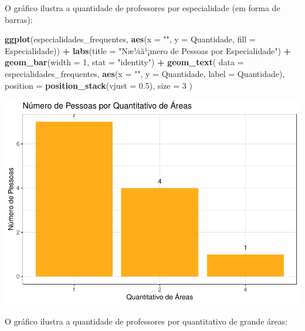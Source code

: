 \documentclass[]{article}
\newenvironment{Shaded}{\begin{snugshade}}{\end{snugshade}}
\newcommand{\DataTypeTok}[1]{\textcolor[rgb]{0.13,0.29,0.53}{#1}}
\newcommand{\DecValTok}[1]{\textcolor[rgb]{0.00,0.00,0.81}{#1}}
\newcommand{\FloatTok}[1]{\textcolor[rgb]{0.00,0.00,0.81}{#1}}
\newcommand{\KeywordTok}[1]{\textcolor[rgb]{0.13,0.29,0.53}{\textbf{#1}}}
\newcommand{\NormalTok}[1]{#1}
\newcommand{\OperatorTok}[1]{\textcolor[rgb]{0.81,0.36,0.00}{\textbf{#1}}}
\newcommand{\StringTok}[1]{\textcolor[rgb]{0.31,0.60,0.02}{#1}}
\begin{document}
O gráfico ilustra a quantidade de professores por especialidade (em
forma de barras):

\begin{Shaded}
\begin{Highlighting}[]
\KeywordTok{ggplot}\NormalTok{(especialidades_frequentes,}
       \KeywordTok{aes}\NormalTok{(}\DataTypeTok{x =} \StringTok{""}\NormalTok{, }\DataTypeTok{y =}\NormalTok{ Quantidade, }\DataTypeTok{fill =}\NormalTok{ Especialidade)) }\OperatorTok{+}
\StringTok{  }\KeywordTok{labs}\NormalTok{(}\DataTypeTok{title =} \StringTok{"Næ¼ã¹¡mero de Pessoas por Especialidade"}\NormalTok{) }\OperatorTok{+}
\StringTok{  }\KeywordTok{geom_bar}\NormalTok{(}\DataTypeTok{width =} \DecValTok{1}\NormalTok{, }\DataTypeTok{stat =} \StringTok{"identity"}\NormalTok{) }\OperatorTok{+}
\StringTok{  }\KeywordTok{geom_text}\NormalTok{(}
    \DataTypeTok{data =}\NormalTok{ especialidades_frequentes,}
    \KeywordTok{aes}\NormalTok{(}\DataTypeTok{x =} \StringTok{""}\NormalTok{, }\DataTypeTok{y =}\NormalTok{ Quantidade, }\DataTypeTok{label =}\NormalTok{ Quantidade),}
    \DataTypeTok{position =} \KeywordTok{position_stack}\NormalTok{(}\DataTypeTok{vjust =} \FloatTok{0.5}\NormalTok{),}
    \DataTypeTok{size =} \DecValTok{3}
\NormalTok{  )}
\end{Highlighting}
\end{Shaded}

\includegraphics{LuanFreitas.relatorio2_files/figure-latex/unnamed-chunk-71-1.pdf}

O gráfico ilustra a quantidade de professores por quantitativo de grande
áreas:
\end{document}
